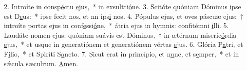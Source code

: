 2. Introíte in consp\uline{é}ctu \uline{e}jus,~* in exsultti\uline{ó}ne.
3. Scitóte quóniam Dóminus \uline{i}pse est D\uline{e}us:~* ipse fecit nos, et nn ips\uline{i} nos.
4. Pópulus ejus, et oves páscuæ ejus:~† introíte portas ejus in conf\uline{e}ssi\uline{ó}ne,~* átria ejus in hymnis: confitémni \uline{i}lli.
5. Laudáte nomen ejus: quóniam suávis est Dóminus,~† in ætérnum miseric\uline{ó}rdia \uline{e}jus,~* et usque in generatiónem et generatiónem vértas \uline{e}jus.
6. Glória P\uline{a}tri, et F\uline{í}lio,~* et Spiríti S\uline{a}ncto.
7. Sicut erat in princípio, et n\uline{u}nc, et s\uline{e}mper,~* et in sǽcula sæculrum. \uline{A}men.
